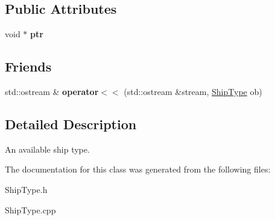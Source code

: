 \subsection*{\-Public \-Attributes}
\begin{DoxyCompactItemize}
\item 
\hypertarget{classShipType_ab99796546b5ce21514814e8f103ab7ba}{void $\ast$ {\bfseries ptr}}\label{classShipType_ab99796546b5ce21514814e8f103ab7ba}

\end{DoxyCompactItemize}
\subsection*{\-Friends}
\begin{DoxyCompactItemize}
\item 
\hypertarget{classShipType_a5faff9ca7b03900f06bf581a873b16a6}{std\-::ostream \& {\bfseries operator$<$$<$} (std\-::ostream \&stream, \hyperlink{classShipType}{\-Ship\-Type} ob)}\label{classShipType_a5faff9ca7b03900f06bf581a873b16a6}

\end{DoxyCompactItemize}


\subsection{\-Detailed \-Description}
\-An available ship type. 

\-The documentation for this class was generated from the following files\-:\begin{DoxyCompactItemize}
\item 
\-Ship\-Type.\-h\item 
\-Ship\-Type.\-cpp\end{DoxyCompactItemize}
